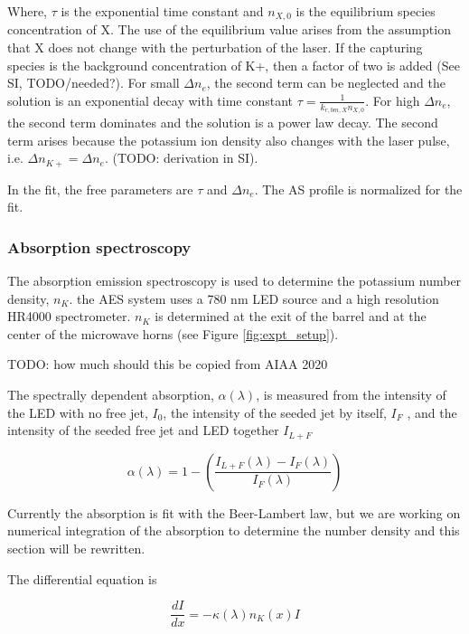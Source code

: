Where, $\tau$ is the exponential time constant and $n_{X,0}$ is the equilibrium species concentration of X. The use of the equilibrium value arises from the assumption that X does not change with the perturbation of the laser. If the capturing species is the background concentration of K+, then a factor of two is added (See SI, TODO/needed?). For small $\Delta n_e$, the second term can be neglected and the solution is an exponential decay with time constant $\tau = \frac{1}{k_{r,bm,X}n_{X,0}}$. For high $\Delta n_e$, the second term dominates and the solution is a power law decay. The second term arises because the potassium ion density also changes with the laser pulse, i.e. $\Delta n_{K+} = \Delta n_e$. (TODO: derivation in SI). 

In the fit, the free parameters are $\tau$ and $\Delta n_e$. The AS profile is normalized for the fit. 

\subsubsection{Absorption spectroscopy}

The absorption emission spectroscopy is used to determine the potassium number density, $n_K$. the AES system uses a 780 nm LED source and a high resolution HR4000 spectrometer. $n_K$ is determined at the exit of the barrel and at the center of the microwave horns (see Figure \ref{fig:expt_setup}).

TODO: how much should this be copied from AIAA 2020

The spectrally dependent absorption, $\alpha(\lambda)$, is measured from the intensity of the LED with no free jet, $I_0$, the intensity
of the seeded jet by itself, $I_F$ , and the intensity of the seeded free jet and LED together $I_{L+F}$


\begin{equation}
    \alpha(\lambda) = 1 - \left(\frac{I_{L+F}(\lambda) - I_{F}(\lambda)}{I_F(\lambda)}\right)
\end{equation}

Currently the absorption is fit with the Beer-Lambert law, but we are working on numerical integration of the absorption to determine the number density and this section will be rewritten. 

The differential equation is 

\begin{equation}
    \frac{dI}{dx} = -\kappa(\lambda) n_K(x) I
\end{equation}

